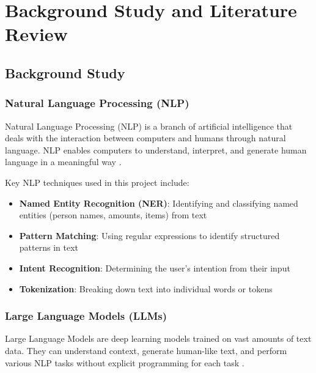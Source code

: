 
\chapter{Background Study and Literature Review}

\section{Background Study}

\subsection{Natural Language Processing (NLP)}

Natural Language Processing (NLP) is a branch of artificial intelligence that deals with the interaction between computers and humans through natural language. NLP enables computers to understand, interpret, and generate human language in a meaningful way \cite{jurafsky2009speech}.

Key NLP techniques used in this project include:

\begin{itemize}
    \item \textbf{Named Entity Recognition (NER)}: Identifying and classifying named entities (person names, amounts, items) from text
    \item \textbf{Pattern Matching}: Using regular expressions to identify structured patterns in text
    \item \textbf{Intent Recognition}: Determining the user's intention from their input
    \item \textbf{Tokenization}: Breaking down text into individual words or tokens
\end{itemize}

\subsection{Large Language Models (LLMs)}

Large Language Models are deep learning models trained on vast amounts of text data. They can understand context, generate human-like text, and perform various NLP tasks without explicit programming for each task \cite{brown2020language}.

